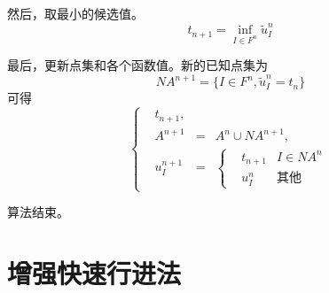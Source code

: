 然后，取最小的候选值。
\begin{equation*}
    \label{min_tn+1}
    t_{n+1} = \underset{I \in F^n}{\inf} \widetilde{u}^n_I
\end{equation*}

最后，更新点集和各个函数值。新的已知点集为
\begin{equation*}
    \label{new_an+1}
    NA^{n+1} = \{I \in F^n, \widetilde{u}^n_I = t_n\}
\end{equation*}
可得
\begin{equation*}
    \label{new_values}
    \left\{
    \begin{aligned}
    & t_{n+1},\\
    & A^{n+1} & = & A^n \cup NA^{n+1}, \\
    & u^{n+1}_I & = & \left\{
        \begin{aligned}
        & t_{n+1} & I \in NA^n \\
        & u^n_I & \mbox{其他}
        \end{aligned}
        \right.
    \end{aligned}
    \right.
\end{equation*}

算法结束。

\section{增强快速行进法}

